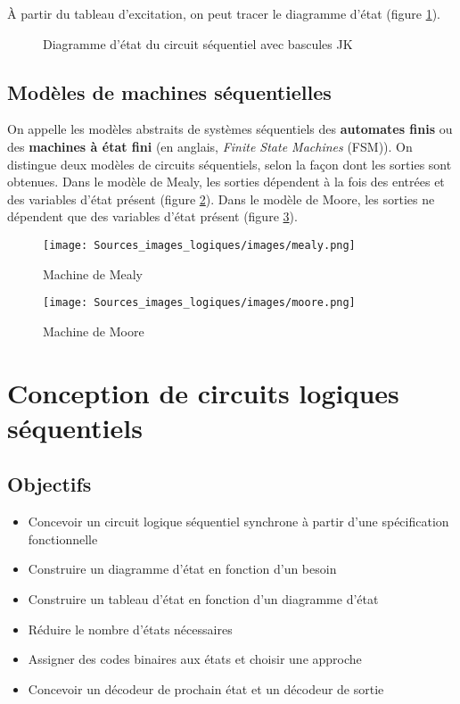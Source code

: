 \documentclass[11pt]{article}
\begin{document}
À partir du tableau d'excitation, on peut tracer le diagramme d'état
(figure \ref{fig:org1f359ed}).

\begin{figure}[htbp]
\centering

\caption{\label{fig:org1f359ed}Diagramme d'état du circuit séquentiel avec bascules JK}
\end{figure}

\subsection{Modèles de machines séquentielles}
\label{sec:orgd5f9a2f}

On appelle les modèles abstraits de systèmes séquentiels des
\textbf{automates finis} ou des \textbf{machines à état fini} (en anglais, \emph{Finite
State Machines} (FSM)).  On distingue deux modèles de circuits
séquentiels, selon la façon dont les sorties sont obtenues. Dans le
modèle de Mealy, les sorties dépendent à la fois des entrées et des
variables d'état présent (figure \ref{fig:org98b884d}). Dans le modèle de Moore,
les sorties ne dépendent que des variables d'état présent (figure
\ref{fig:org6fc1590}).

\begin{figure}[htbp]
\centering
\texttt{[image: Sources\_images\_logiques/images/mealy.png]}
\caption{\label{fig:org98b884d}Machine de Mealy}
\end{figure}

\begin{figure}[htbp]
\centering
\texttt{[image: Sources\_images\_logiques/images/moore.png]}
\caption{\label{fig:org6fc1590}Machine de Moore}
\end{figure}

\section{Conception de circuits logiques séquentiels}
\label{sec:org4bff0e3}
\subsection{Objectifs}
\label{sec:org6af456c}
\begin{itemize}
\item Concevoir un circuit logique séquentiel synchrone à partir
d'une spécification fonctionnelle
\item Construire un diagramme d'état en fonction d'un besoin
\item Construire un tableau d'état en fonction d'un diagramme d'état
\item Réduire le nombre d'états nécessaires
\item Assigner des codes binaires aux états et choisir une approche
\item Concevoir un décodeur de prochain état et un décodeur de sortie
\end{itemize}
\end{document}
